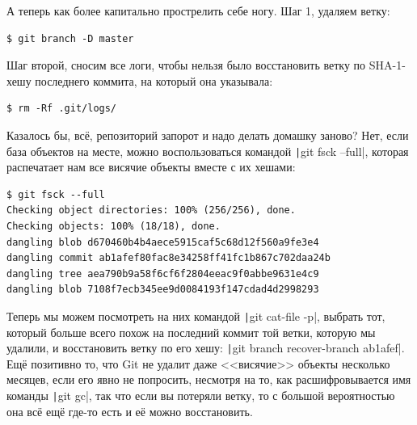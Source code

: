 \documentclass[a5paper]{article}
\begin{document}
А теперь как более капитально прострелить себе ногу. Шаг 1, удаляем ветку:

\begin{verbatim}
$ git branch -D master
\end{verbatim}

Шаг второй, сносим все логи, чтобы нельзя было восстановить ветку по SHA-1-хешу последнего коммита, на который она указывала:

\begin{verbatim}
$ rm -Rf .git/logs/
\end{verbatim}

Казалось бы, всё, репозиторий запорот и надо делать домашку заново? Нет, если база объектов на месте, можно воспользоваться командой \texttt|git fsck --full|, которая распечатает нам все висячие объекты вместе с их хешами:

\begin{verbatim}
$ git fsck --full
Checking object directories: 100% (256/256), done.
Checking objects: 100% (18/18), done.
dangling blob d670460b4b4aece5915caf5c68d12f560a9fe3e4
dangling commit ab1afef80fac8e34258ff41fc1b867c702daa24b
dangling tree aea790b9a58f6cf6f2804eeac9f0abbe9631e4c9
dangling blob 7108f7ecb345ee9d0084193f147cdad4d2998293
\end{verbatim}

Теперь мы можем посмотреть на них командой \texttt|git cat-file -p|, выбрать тот, который больше всего похож на последний коммит той ветки, которую мы удалили, и восстановить ветку по его хешу: \texttt|git branch recover-branch ab1afef|. Ещё позитивно то, что Git не удалит даже <<висячие>> объекты несколько месяцев, если его явно не попросить, несмотря на то, как расшифровывается имя команды \texttt|git gc|, так что если вы потеряли ветку, то с большой вероятностью она всё ещё где-то есть и её можно восстановить.
\end{document}
